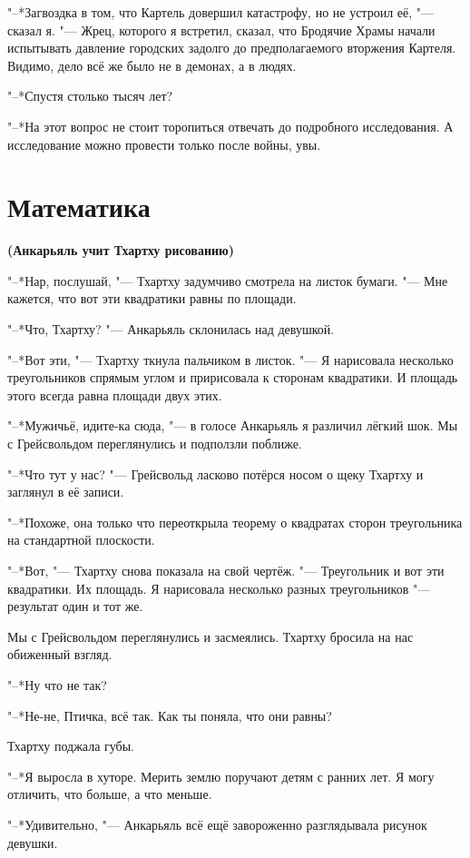 "--*Загвоздка в том, что Картель довершил катастрофу, но не устроил её, "--- сказал я.
"--- Жрец, которого я встретил, сказал, что Бродячие Храмы начали испытывать давление городских задолго до предполагаемого вторжения Картеля.
Видимо, дело всё же было не в демонах, а в людях.

"--*Спустя столько тысяч лет?

"--*На этот вопрос не стоит торопиться отвечать до подробного исследования.
А исследование можно провести только после войны, увы.

\section{Математика}

\textbf{(Анкарьяль учит Тхартху рисованию)}

"--*Нар, послушай, "--- Тхартху задумчиво смотрела на листок бумаги.
"--- Мне кажется, что вот эти квадратики равны по площади.

"--*Что, Тхартху? "--- Анкарьяль склонилась над девушкой.

"--*Вот эти, "--- Тхартху ткнула пальчиком в листок.
"--- Я нарисовала несколько треугольников с\ldotst прямым углом и пририсовала к сторонам квадратики.
И площадь этого всегда равна площади двух этих.

"--*Мужичьё, идите-ка сюда, "--- в голосе Анкарьяль я различил лёгкий шок.
Мы с Грейсвольдом переглянулись и подползли поближе.

"--*Что тут у нас? "--- Грейсвольд ласково потёрся носом о щеку Тхартху и заглянул в её записи.

"--*Похоже, она только что переоткрыла теорему о квадратах сторон треугольника на стандартной плоскости.

"--*Вот, "--- Тхартху снова показала на свой чертёж.
"--- Треугольник и вот эти квадратики.
Их площадь.
Я нарисовала несколько разных треугольников "--- результат один и тот же.

Мы с Грейсвольдом переглянулись и засмеялись.
Тхартху бросила на нас обиженный взгляд.

"--*Ну что не так?

"--*Не-не, Птичка, всё так.
Как ты поняла, что они равны?

Тхартху поджала губы.

"--*Я выросла в хуторе.
Мерить землю поручают детям с ранних лет.
Я могу отличить, что больше, а что меньше.

"--*Удивительно, "--- Анкарьяль всё ещё завороженно разглядывала рисунок девушки.

